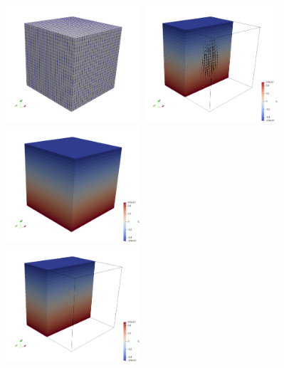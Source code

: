 


\begin{center}
\includegraphics[width=5cm]{python_codes/fieldstone_stokes_sphere_3D/grid}
\includegraphics[width=5cm]{python_codes/fieldstone_stokes_sphere_3D/vel}
\includegraphics[width=5cm]{python_codes/fieldstone_stokes_sphere_3D/press}\\
\includegraphics[width=5cm]{python_codes/fieldstone_stokes_sphere_3D/press2}

\end{center}
